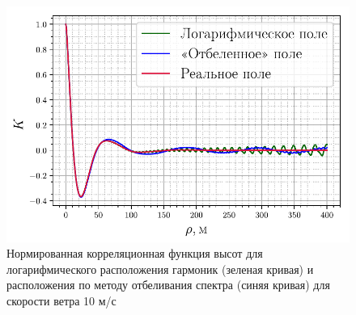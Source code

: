 \begin{figure}[h!]
    \centering
    \includegraphics[width=0.6\linewidth]{fig/correlation_height_wa.pdf}
    \caption{ Нормированная корреляционная функция высот для логарифмического расположения
    гармоник (зеленая кривая) и расположения по методу отбеливания спектра
(синяя кривая) для скорости ветра 10 м/с}
    \label{fig:nodes1}
\end{figure}




